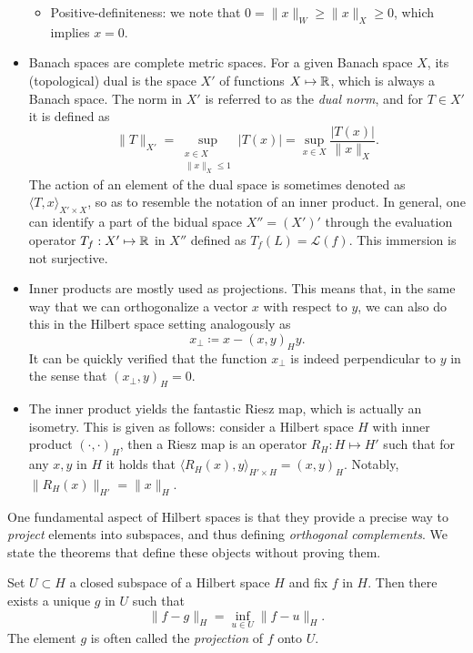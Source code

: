 \begin{itemize}
\begin{itemize}
        \item Positive-definiteness: we note that $0=\|x\|_W\geq \|x\|_X\geq 0$, which implies $x=0$.
    \end{itemize}
    \item Banach spaces are complete metric spaces. For a given Banach space $X$, its (topological) dual is the space $X'$ of functions $X\mapsto \mathbb{R}$, which is always a Banach space. The norm in $X'$ is referred to as the \emph{dual norm}, and for $T\in X'$ it is defined as 
        \begin{equation}\label{eq:dual-norm}
        \|T\|_{X'} = \sup_{\substack{x\in X\\ \|x\|_X\leq 1}} |T(x)|= \sup_{x\in X}\frac{|T(x)|}{\|x\|_X}.
        \end{equation}
    The action of an element of the dual space is sometimes denoted as $\langle T, x\rangle_{X'\times X}$, so as to resemble the notation of an inner product. In general, one can identify a part of the bidual space $X'' = (X')'$ through the evaluation operator $T_f:X'\mapsto \mathbb{R}$ in $X''$ defined as $T_f(L) = \mathcal{L}(f)$. This immersion is not surjective. 
    \item Inner products are mostly used as projections. This means that, in the same way that we can orthogonalize a vector $x$ with respect to $y$, we can also do this in the Hilbert space setting analogously as 
    \begin{equation}\label{eq:projection-orthogonalization}
        x_\perp \coloneqq x - (x, y)_H y.
    \end{equation}
    It can be quickly verified that the function $x_\perp$ is indeed perpendicular to $y$ in the sense that $(x_\perp, y)_H=0$. 
    \item The inner product yields the fantastic Riesz map, which is actually an isometry. This is given as follows: consider a Hilbert space $H$ with inner product $(\cdot, \cdot)_H$, then a Riesz map is an operator $R_H: H\mapsto H'$ such that for any $x,y$ in $H$ it holds that $\langle R_H(x), y\rangle_{H'\times H} = (x, y)_H$. Notably, $\|R_H(x)\|_{H'} = \| x \|_H$. 
\end{itemize}
One fundamental aspect of Hilbert spaces is that they provide a precise way to \emph{project} elements into subspaces, and thus defining \emph{orthogonal complements}. We state the theorems that define these objects without proving them. 
\begin{theorem}\label{thm:best-approximation}
    Set $U\subset H$ a closed subspace of a Hilbert space $H$ and fix $f$ in $H$. Then there exists a unique $g$ in $U$ such that
        \begin{equation}\label{eq:best-approximation} 
        \|f - g \|_H = \inf_{u\in U} \| f - u\|_H.
        \end{equation}
    The element $g$ is often called the \emph{projection} of $f$ onto $U$. 
\end{theorem}

